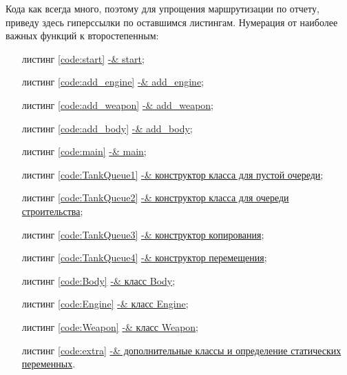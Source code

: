 \documentclass[a4paper, 14pt]{article}
\begin{document}
    Кода как всегда много, поэтому для упрощения маршрутизации по отчету, приведу здесь гиперссылки по оставшимся листингам. Нумерация от наиболее важных функций к второстепенным:
    \begin{enumerate}
	\item[листинг \ref{code:start}] \hyperref[code:start]{ -& start};

    \item[листинг \ref{code:add_engine}]  \hyperref[code:add_engine]{ -& add\_engine};
    
    \item[листинг \ref{code:add_weapon}] \hyperref[code:add_weapon]{ -& add\_weapon};
    
     \item[листинг \ref{code:add_body}] \hyperref[code:add_body]{ -& add\_body};
     
     \item[листинг \ref{code:main}] \hyperref[code:main]{ -& main};
    
    \item[листинг \ref{code:TankQueue1}] \hyperref[code:TankQueue1]{ -& конструктор класса для пустой очереди};
    
    \item[листинг \ref{code:TankQueue2}] \hyperref[code:TankQueue2]{ -& конструктор класса для очереди строительства};
   
   \item[листинг \ref{code:TankQueue3}] \hyperref[code:TankQueue3]{ -& конструктор копирования};
   
    \item[листинг \ref{code:TankQueue4}] \hyperref[code:TankQueue4]{ -& конструктор перемещения};
    
    \item[листинг \ref{code:Body}] \hyperref[code:Body]{ -& класс Body};
    
    \item[листинг \ref{code:Engine}] \hyperref[code:Engine]{ -& класс Engine};
    
    \item[листинг \ref{code:Weapon}] \hyperref[code:Weapon]{ -& класс Weapon};
    
     \item[листинг \ref{code:extra}] \hyperref[code:extra]{ -& дополнительные классы и определение статических переменных}.
    \end{enumerate}
	
\end{document}
